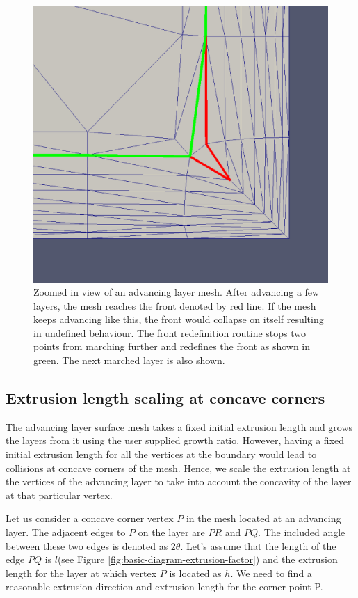 \documentclass[conf]{new-aiaa}
\begin{document}
\begin{figure}[hbt!]
    \centering
    \includegraphics[width=.5\textwidth]{front-before-n-after-redefinition.eps}
    \caption{Zoomed in view of an advancing layer mesh. After advancing a few layers, the mesh reaches the front denoted by red line. If the mesh keeps advancing like this, the front would collapse on itself resulting in undefined behaviour. The front redefinition routine stops two points from marching further and redefines the front as shown in green. The next marched layer is also shown.}
    \label{front-redef}
\end{figure}

\subsection{Extrusion length scaling at concave corners}

The advancing layer surface mesh takes a fixed initial extrusion length and grows the layers from it using the user supplied growth ratio. However, having a fixed initial extrusion length for all the vertices at the boundary would lead to collisions at concave corners of the mesh. Hence, we scale the extrusion length at the vertices of the advancing layer to take into account the concavity of the layer at that particular vertex.

Let us consider a concave corner vertex $P$ in the mesh located at an advancing layer. The adjacent edges to $P$ on the layer are $PR$ and $PQ$. The included angle between these two edges is denoted as $2\theta$. Let's assume that the length of the edge $PQ$ is $l$(see Figure \ref{fig:basic-diagram-extrusion-factor}) and the extrusion length for the layer at which vertex $P$ is located as $h$. We need to find a reasonable extrusion direction and extrusion length for the corner point P.
\end{document}
